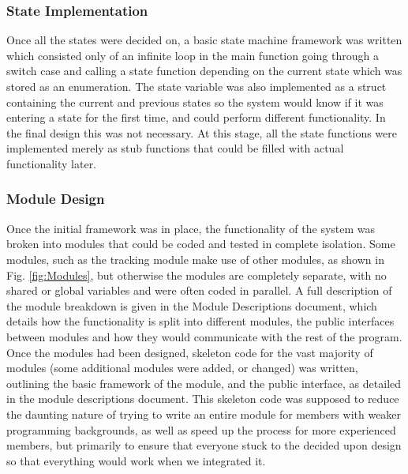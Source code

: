 \documentclass[]{report}
\begin{document}
\subsubsection{State Implementation}
Once all the states were decided on, a basic state machine framework was written which consisted only of an infinite loop in the main function going through a switch case and calling a state function depending on the current state which was stored as an enumeration. The state variable was also implemented as a struct containing the current and previous states so the system would know if it was entering a state for the first time, and could perform different functionality. In the final design this was not necessary. \newline
At this stage, all the state functions were implemented merely as stub functions that could be filled with actual functionality later.

\subsubsection{Module Design}
Once the initial framework was in place, the functionality of the system was broken into modules that could be coded and tested in complete isolation. Some modules, such as the tracking module make use of other modules, as shown in Fig. \ref{fig:Modules}, but otherwise the modules are completely separate, with no shared or global variables and were often coded in parallel. \newline
A full description of the module breakdown is given in the Module Descriptions document, which details how the functionality is split into different modules, the public interfaces between modules and how they would communicate with the rest of the program. \newline
Once the modules had been designed, skeleton code for the vast majority of modules (some additional modules were added, or changed) was written, outlining the basic framework of the module, and the public interface, as detailed in the module descriptions document. This skeleton code was supposed to reduce the daunting nature of trying to write an entire module for members with weaker programming backgrounds, as well as speed up the process for more experienced members, but primarily to ensure that everyone stuck to the decided upon design so that everything would work when we integrated it.
\end{document}
